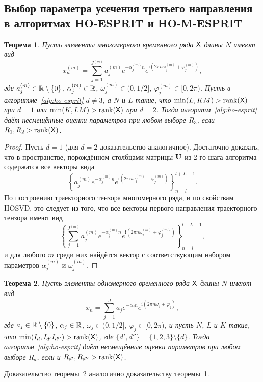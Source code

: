 \documentclass[specialist,
  substylefile=spbu_report.rtx,
subf,href,colorlinks=true, 12pt]{disser}
\theoremstyle{plain}
\newtheorem{theorem}{Теорема}
\theoremstyle{definition}
\theoremstyle{remark}
\newcommand{\iu}{\mathrm{i}}
\begin{document}
\subsection{Выбор параметра усечения третьего направления в алгоритмах
HO-ESPRIT и HO-M-ESPRIT}\label{subsec:ho-esprit-r3}
\begin{theorem}\label{theorem:ho-m-esprit-r3}
  Пусть элементы многомерного временного ряда $\mathsf{X}$ длины $N$ имеют вид
  \begin{equation*}
    x_n^{(m)} = \sum_{j=1}^{J^{(m)}} a_j^{(m)} e^{-\alpha_j^{(m)} n} e^{\iu
      \left(2 \pi n \omega_j^{(m)}
    + \varphi_j^{(m)}\right)},
  \end{equation*}
  где $a_j^{(m)} \in \mathbb{R} \setminus \{0\}$, $\alpha_j^{(m)} \in
  \mathbb{R}$, $\omega_j^{(m)}
  \in (0, 1/2]$, $\varphi_j^{(m)} \in [0, 2\pi)$.
  Пусть в алгоритме~\ref{alg:ho-esprit} $d \ne 3$, а $N$ и $L$ такие,
  что $\min(L, KM) > \operatorname{rank}(\mathsf{X})$
  при $d=1$ или $\min(K, LM) > \operatorname{rank}(\mathsf{X})$ при $d=2$.
  Тогда алгоритм~\ref{alg:ho-esprit} даёт несмещённые оценки
  параметров при любом выборе $R_3$, если $R_1, R_2 >
  \operatorname{rank}(\mathsf{X})$.
\end{theorem}
\begin{proof}
  Пусть $d = 1$ (для $d=2$ доказательство аналогичное). Достаточно
  доказать, что в пространстве, порождённом столбцами
  матрицы $\mathbf{U}$ из 2-го шага алгоритма содержатся все векторы вида
  \[
    \left\{a_j^{(m)} e^{-\alpha_j^{(m)} n} e^{\iu
        \left(2 \pi n \omega_j^{(m)}
    + \varphi_j^{(m)}\right)}\right\}_{n=l}^{l+L-1}.
  \]
  По построению траекторного тензора многомерного ряда, и по
  свойствам HOSVD, это
  следует из того, что все векторы первого направления траекторного
  тензора имеют вид
  \[
    \left\{\sum_{j=1}^{J^{(m)}} a_j^{(m)} e^{-\alpha_j^{(m)} n} e^{\iu
        \left(2 \pi n \omega_j^{(m)}
    + \varphi_j^{(m)}\right)}\right\}_{n=l}^{l + L - 1},
  \]
  и для любого $m$ среди них найдётся вектор с соответствующим
  набором параметров $\alpha_j^{(m)}$ и $\omega_j^{(m)}$.
\end{proof}

\begin{theorem}\label{theorem:ho-esprit-r3}
  Пусть элементы одномерного временного ряда $\mathsf{X}$ длины $N$ имеют вид
  \begin{equation*}
    x_n = \sum_{j=1}^{J} a_j e^{-\alpha_j n} e^{\iu
    \left(2 \pi n \omega_j + \varphi_j\right)},
  \end{equation*}
  где $a_j \in \mathbb{R} \setminus \{0\}$, $\alpha_j \in \mathbb{R}$, $\omega_j
  \in (0, 1/2]$, $\varphi_j \in [0, 2\pi)$,
  и пусть $N$, $L$ и $K$ такие, что $\min(I_d, I_{d'}
  I_{d''}) >
  \operatorname{rank}(\mathsf{X})$, где $\{d', d''\} = \{1, 2, 3\}\setminus\{d\}$.
  Тогда алгоритм~\ref{alg:ho-esprit} даёт несмещённые оценки
  параметров при любом выборе $R_d$, если  и $R_{d'}, R_{d''} >
  \operatorname{rank}(\mathsf{X})$.
\end{theorem}
Доказательство теоремы~\ref{theorem:ho-esprit-r3} аналогично
доказательству теоремы~\ref{theorem:ho-m-esprit-r3}.
\end{document}
